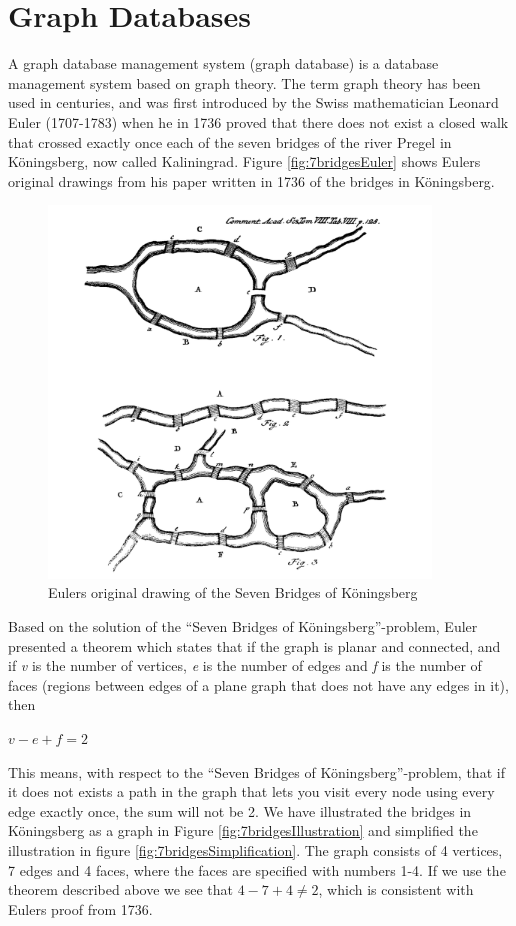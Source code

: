 \section{Graph Databases}
A graph database management system (graph database) \citep{robinson13} is a database management system based on graph theory. The term graph theory has been used in centuries, and was first introduced by the Swiss mathematician Leonard Euler (1707-1783) when he in 1736 proved that there does not exist a closed walk that crossed exactly once each of the seven bridges of the river Pregel in Köningsberg, now called Kaliningrad\citep{alexanderson06}. Figure \vref{fig:7bridgesEuler} shows Eulers original drawings from his paper written in 1736 \citep{euler1741} of the bridges in Köningsberg. 

\begin{figure}[H]
  \centering
  \includegraphics[width=4in]{assets/7bridges-euler.png}
  \caption{Eulers original drawing of the Seven Bridges of Köningsberg} 
  \label{fig:7bridgesEuler}
\end{figure}

Based on the solution of the ``Seven Bridges of Köningsberg''-problem, Euler presented a theorem which states that if the graph is planar and connected, and if \textit{v} is the number of vertices, \textit{e} is the number of edges and \textit{f} is the number of faces (regions between edges of a plane graph that does not have any edges in it), then 
\newline
\newline
\centerline{$v-e+f=2$}
\newline
\newline
This means, with respect to the ``Seven Bridges of Köningsberg''-problem, that if it does not exists a path in the graph that lets you visit every node using every edge exactly once, the sum will not be 2. We have illustrated the bridges in Köningsberg as a graph in Figure \vref{fig:7bridgesIllustration} and simplified the illustration in figure \vref{fig:7bridgesSimplification}. The graph consists of 4 vertices, 7 edges and 4 faces, where the faces are specified with numbers 1-4. If we use the theorem described above we see that $4-7+4\neq2$, which is consistent with Eulers proof from 1736. 

